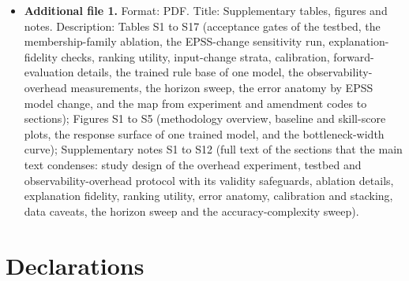 \documentclass[referee,lineno,pdflatex,sn-basic]{sn-jnl}%
\theoremstyle{thmstyleone}%
\theoremstyle{thmstyletwo}%
\theoremstyle{thmstylethree}%
\begin{document}
\begin{itemize}
\item \textbf{Additional file 1.} Format: PDF. Title: Supplementary tables, figures and notes. Description: Tables S1 to S17 (acceptance gates of the testbed, the membership-family ablation, the EPSS-change sensitivity run, explanation-fidelity checks, ranking utility, input-change strata, calibration, forward-evaluation details, the trained rule base of one model, the observability-overhead measurements, the horizon sweep, the error anatomy by EPSS model change, and the map from experiment and amendment codes to sections); Figures S1 to S5 (methodology overview, baseline and skill-score plots, the response surface of one trained model, and the bottleneck-width curve); Supplementary notes S1 to S12 (full text of the sections that the main text condenses: study design of the overhead experiment, testbed and observability-overhead protocol with its validity safeguards, ablation details, explanation fidelity, ranking utility, error anatomy, calibration and stacking, data caveats, the horizon sweep and the accuracy-complexity sweep).
\end{itemize}

\section*{Declarations}
\end{document}
